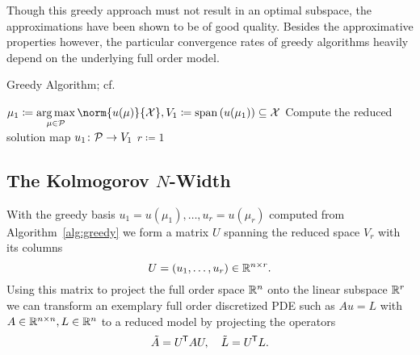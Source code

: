Though this greedy approach must not result in an optimal subspace, the approximations have been shown to be of good quality.
Besides the approximative properties however, the particular convergence rates of greedy algorithms heavily depend on the underlying full order model.

\begin{algorithm}\label{alg:greedy}
    \caption{Greedy Algorithm; cf.~\cite[Algorithm~1]{Buffa2012}}
    $\mu_1 \coloneqq \argmax\limits_{\mu \in \mcl{P}} \norm{u(\mu)}{\mcl{X}}, V_1 \coloneqq \lspn{u(\mu_1)} \subseteq \mcl{X}$\;
    Compute the reduced solution map $u_1 \colon \mathcal{P} \to V_1$\;
    $r \coloneqq 1$\;
\end{algorithm}

\subsection[The Kolmogorov N-Width]{The Kolmogorov {$N$}-Width}\label{subsec:kolmogorov-n-width}

With the greedy basis $u_1 = u(\mu_1), \dots, u_r = u(\mu_r)$ computed from Algorithm~\ref{alg:greedy} we form a matrix $U$ spanning the reduced space $V_r$ with its columns
\begin{equation*}
    U = \left( u_1, \dots, u_r \right) \in \mathbb{R}^{n \times r}.
\end{equation*}
Using this matrix to project the full order space $\mathbb{R}^n$ onto the linear subspace $\mathbb{R}^r$ we can transform an exemplary full order discretized PDE such as $A u = L$ with $A \in \mathbb{R}^{n \times n}, L \in \mathbb{R}^n$ to a reduced model by projecting the operators
\begin{equation*}
    \tilde{A} = U^{\mkern-1.5mu \mathsf{T}} A U,\quad \tilde{L} = U^{\mkern-1.5mu \mathsf{T}} L.
\end{equation*}

